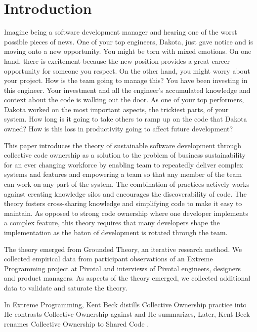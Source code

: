 
\section{Introduction}

Imagine being a software development manager and hearing one of the worst possible pieces of news.  One of your top engineers, Dakota, just gave notice and is moving onto a new opportunity. You might be torn with mixed emotions. On one hand, there is excitement because the new position provides a great career opportunity for someone you respect. On the other hand, you might worry about your project. How is the team going to manage this? You have been investing in this engineer. Your investment and all the engineer's accumulated knowledge and context about the code is walking out the door.  As one of your top performers, Dakota worked on the most important aspects, the trickiest parts, of your system. How long is it going to take others to ramp up on the code that Dakota owned? How is this loss in productivity going to affect future development? 

This paper introduces the theory of sustainable software development through collective code ownership as a solution to the problem of business sustainability for an ever changing workforce by enabling team to repeatedly deliver complex systems and features and empowering a team so that any member of the team can work on any part of the system. The combination of practices actively works against creating knowledge silos and encourages the discoverability of code. The theory fosters cross-sharing knowledge and simplifying code to make it easy to maintain. As opposed to strong code ownership where one developer implements a complex feature, this theory requires that many developers shape the implementation as the baton of development is rotated through the team.

The theory emerged from Grounded Theory, an iterative research method. We collected empirical data from participant observations of an Extreme Programming project at Pivotal and interviews of Pivotal engineers, designers and product managers. As aspects of the theory emerged, we collected additional data to validate and saturate the theory.

In Extreme Programming, Kent Beck distills Collective Ownership practice into  He contrasts Collective Ownership against  and  He summarizes,   \cite{ExtremeProgramming2000} Later, Kent Beck renames Collective Ownership to Shared Code \cite{ExtremeProgramming2004}. 

